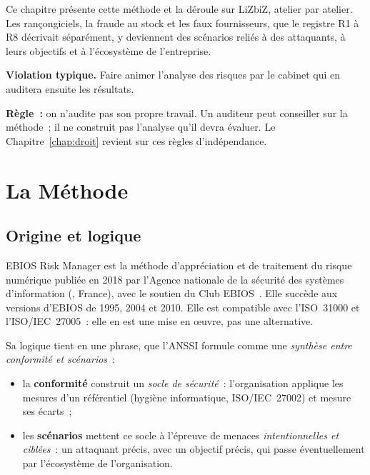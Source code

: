 \medskip

Ce chapitre présente cette méthode et la déroule sur LiZbiZ, atelier par
atelier. Les rançongiciels, la fraude au stock et les faux fournisseurs,
que le registre R1 à R8 décrivait séparément, y deviennent des scénarios
reliés à des attaquants, à leurs objectifs et à l'écosystème de
l'entreprise.

\begin{boxalert}
\textbf{Violation typique.} Faire animer l'analyse des risques par le
cabinet qui en auditera ensuite les résultats.

\smallskip
\textbf{Règle~:} on n'audite pas son propre travail. Un auditeur peut
conseiller sur la méthode~; il ne construit pas l'analyse qu'il devra
évaluer. Le Chapitre~\ref{chap:droit} revient sur ces règles
d'indépendance.
\end{boxalert}

\separateur

\section{La Méthode}
\label{sec:c04-methode}

\subsection{Origine et logique}

EBIOS Risk Manager est la méthode d'appréciation et de traitement du risque
numérique publiée en 2018 par l'Agence nationale de la sécurité des
systèmes d'information (, France), avec le soutien du Club
EBIOS~\cite{anssi2018ebios}. Elle succède aux versions d'EBIOS de 1995,
2004 et 2010. Elle est compatible avec l'ISO~31000 et l'ISO/IEC~27005~:
elle en est une mise en œuvre, pas une alternative.

Sa logique tient en une phrase, que l'ANSSI formule comme une
\emph{synthèse entre conformité et scénarios}~:
\begin{itemize}
    \item la \textbf{conformité} construit un \emph{socle de sécurité}~:
          l'organisation applique les mesures d'un référentiel (hygiène
          informatique, ISO/IEC~27002) et mesure ses écarts~;
    \item les \textbf{scénarios} mettent ce socle à l'épreuve de menaces
          \emph{intentionnelles et ciblées}~: un attaquant précis, avec un
          objectif précis, qui passe éventuellement par l'écosystème de
          l'organisation.
\end{itemize}

